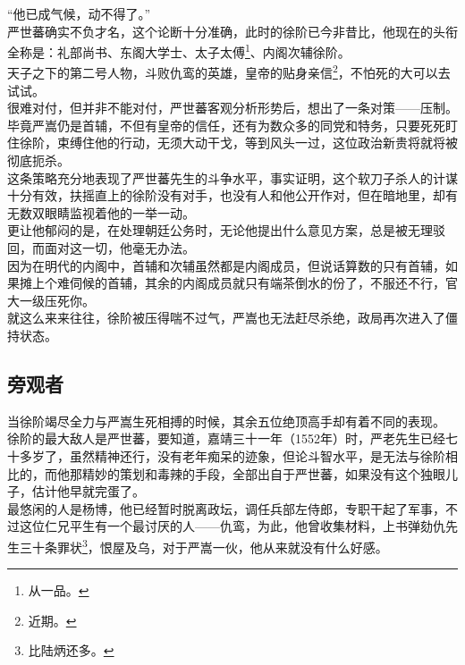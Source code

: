 \begin{multicols}{\theparacolNo}
“他已成气候，动不得了。”\\

严世蕃确实不负才名，这个论断十分准确，此时的徐阶已今非昔比，他现在的头衔全称是：礼部尚书、东阁大学士、太子太傅\footnote{从一品。}、内阁次辅徐阶。\\

天子之下的第二号人物，斗败仇鸾的英雄，皇帝的贴身亲信\footnote{近期。}，不怕死的大可以去试试。\\

很难对付，但并非不能对付，严世蕃客观分析形势后，想出了一条对策——压制。\\

毕竟严嵩仍是首辅，不但有皇帝的信任，还有为数众多的同党和特务，只要死死盯住徐阶，束缚住他的行动，无须大动干戈，等到风头一过，这位政治新贵将就将被彻底扼杀。\\

这条策略充分地表现了严世蕃先生的斗争水平，事实证明，这个软刀子杀人的计谋十分有效，扶摇直上的徐阶没有对手，也没有人和他公开作对，但在暗地里，却有无数双眼睛监视着他的一举一动。\\

更让他郁闷的是，在处理朝廷公务时，无论他提出什么意见方案，总是被无理驳回，而面对这一切，他毫无办法。\\

因为在明代的内阁中，首辅和次辅虽然都是内阁成员，但说话算数的只有首辅，如果摊上个难伺候的首辅，其余的内阁成员就只有端茶倒水的份了，不服还不行，官大一级压死你。\\

就这么来来往往，徐阶被压得喘不过气，严嵩也无法赶尽杀绝，政局再次进入了僵持状态。\\

\subsection{旁观者}
当徐阶竭尽全力与严嵩生死相搏的时候，其余五位绝顶高手却有着不同的表现。\\

徐阶的最大敌人是严世蕃，要知道，嘉靖三十一年（1552年）时，严老先生已经七十多岁了，虽然精神还行，没有老年痴呆的迹象，但论斗智水平，是无法与徐阶相比的，而他那精妙的策划和毒辣的手段，全部出自于严世蕃，如果没有这个独眼儿子，估计他早就完蛋了。\\

最悠闲的人是杨博，他已经暂时脱离政坛，调任兵部左侍郎，专职干起了军事，不过这位仁兄平生有一个最讨厌的人——仇鸾，为此，他曾收集材料，上书弹劾仇先生三十条罪状\footnote{比陆炳还多。}，恨屋及乌，对于严嵩一伙，他从来就没有什么好感。\\


\end{multicols}
